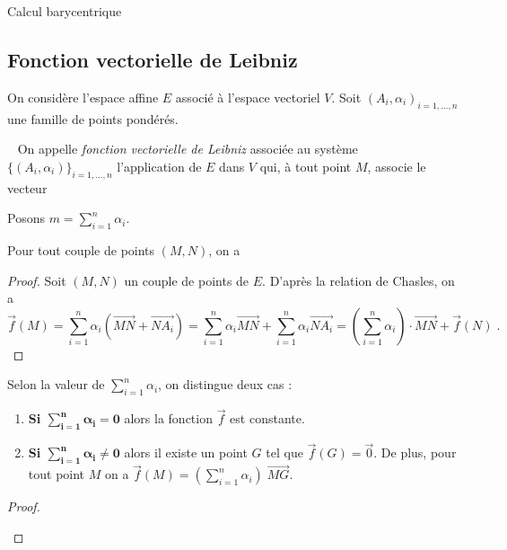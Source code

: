 \begin{chapter}{Calcul barycentrique}
\subsection{Fonction vectorielle de Leibniz}
%
On consid\`ere l'espace affine $E$ associ\'e \`a l'espace vectoriel $V$. 
Soit $(A_i , \alpha_i)_{i = 1 , \dots , n}$ une famille de points pond\'er\'es.
\begin{defi} ~ \newline
On appelle \emph{fonction vectorielle de Leibniz} associ\'ee au syst\`eme
$\{(A_i,\alpha_i)\}_{i=1,\dots,n}$ l'application de $E$ dans $V$ qui, \`a tout point $M$, associe le vecteur
\end{defi}
%
Posons $m = \sum_{i = 1}^{n} \alpha_i$.
%
\begin{prp}
	\label{prp:f(M) = f(N) + m MN}
	Pour tout couple de points $(M , N)$, on a 
	\begin{proof}
		Soit $(M,N)$ un couple de points de $E$.
		D'apr\`es la relation de Chasles, on a 
			\begin{displaymath}
			\vec{f}(M) = \sum_{i = 1}^n \alpha_i ( \overrightarrow{MN} + \overrightarrow{NA_i} ) 
				= \sum_{i = 1}^n \alpha_i  \overrightarrow{MN} + \sum_{i = 1}^n \alpha_i \overrightarrow{NA_i} 
				= \left( \sum_{i = 1}^n \alpha_i \right) \cdot \overrightarrow{MN} + \vec{f}(N)           
			\; .
			\end{displaymath}
	\end{proof}
\end{prp}
%
\begin{prp} \label{prp:fonction vectorielle}
	Selon la valeur de $\sum_{i = 1}^{n} \alpha_i$, on distingue deux cas : 
	\begin{enumerate}
	\item \textbf{Si $\boldsymbol{\sum_{i = 1}^{n} \alpha_i = 0}$ } alors la fonction $\vec{f}$ est constante.
	\item \label{prp: fonction vectorielle 2}
		\textbf{Si $\boldsymbol{\sum_{i = 1}^{n} \alpha_i \neq 0}$ } alors il existe un point $G$ tel que $\vec{f}(G) = \vec{0}$. De plus, pour tout point $M$ on a $\vec{f}(M) = (\sum_{i = 1}^{n} \alpha_i) \; \overrightarrow{MG}$.
	\end{enumerate}
	\begin{proof}
		\begin{enumerate}

\end{enumerate}
\end{proof}
\end{prp}
\end{chapter}
